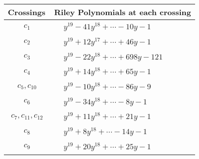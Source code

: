 \documentclass[1p]{elsarticle_modified}
\theoremstyle{definition}
\begin{document}
\begin{tabular}{m{50pt}|m{274pt}}
Crossings & \hspace{64pt}Riley Polynomials at each crossing \\
\hline $$\begin{aligned}c_{1}\end{aligned}$$&$\begin{aligned}
&y^{19}-41 y^{18}+\cdots-10 y-1
\end{aligned}$\\
\hline $$\begin{aligned}c_{2}\end{aligned}$$&$\begin{aligned}
&y^{19}+12 y^{17}+\cdots+46 y-1
\end{aligned}$\\
\hline $$\begin{aligned}c_{3}\end{aligned}$$&$\begin{aligned}
&y^{19}-22 y^{18}+\cdots+698 y-121
\end{aligned}$\\
\hline $$\begin{aligned}c_{4}\end{aligned}$$&$\begin{aligned}
&y^{19}+14 y^{18}+\cdots+65 y-1
\end{aligned}$\\
\hline $$\begin{aligned}c_{5},c_{10}\end{aligned}$$&$\begin{aligned}
&y^{19}-10 y^{18}+\cdots-86 y-9
\end{aligned}$\\
\hline $$\begin{aligned}c_{6}\end{aligned}$$&$\begin{aligned}
&y^{19}-34 y^{18}+\cdots-8 y-1
\end{aligned}$\\
\hline $$\begin{aligned}c_{7},c_{11},c_{12}\end{aligned}$$&$\begin{aligned}
&y^{19}+11 y^{18}+\cdots+21 y-1
\end{aligned}$\\
\hline $$\begin{aligned}c_{8}\end{aligned}$$&$\begin{aligned}
&y^{19}+8 y^{18}+\cdots-14 y-1
\end{aligned}$\\
\hline $$\begin{aligned}c_{9}\end{aligned}$$&$\begin{aligned}
&y^{19}+20 y^{18}+\cdots+25 y-1
\end{aligned}$\\
\hline
\end{tabular}\\~\\
\end{document}
